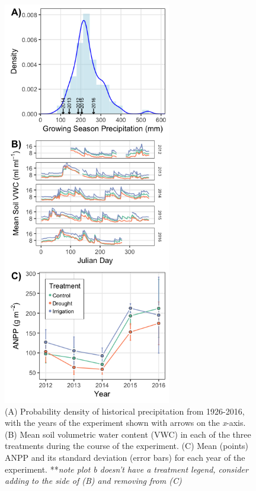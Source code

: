 \documentclass[fleqn,10pt,lineno]{wlpeerj} %
\begin{document}
\begin{figure}[!ht]
  \centering
      \includegraphics[height=7in]{../figures/data_panels.png}
  \caption{(A) Probability density of historical precipitation from 1926-2016, with the years of the experiment shown with arrows on the \emph{x}-axis. (B) Mean soil volumetric water content (VWC) in each of the three treatments during the course of the experiment. (C) Mean (points) ANPP and its standard deviation (error bars) for each year of the experiment. **\emph{note plot b doesn't have a treatment legend, consider adding to the side of (B) and removing from (C)} }
\end{figure}

\newpage{}
\end{document}
